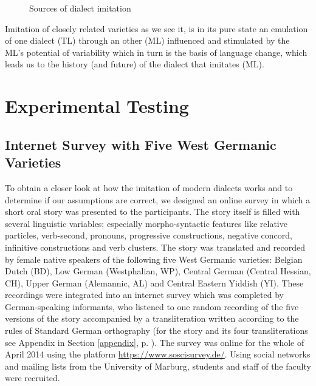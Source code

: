 \documentclass[output=paper]{LSP/langsci}
\begin{document}
\begin{figure}[htbp]
 \begin{center}
              \caption{Sources of dialect imitation}\label{imitationalssubtraktiveFarbmischung}	%
\end{center}
 \end{figure}
\FloatBarrier

 
Imitation of closely related varieties as we see it, is in its pure state an emulation of one dialect (TL) through an other (ML) influenced and stimulated by the ML's potential of variability which in turn is the basis of language change, which leads us to the history (and future) of the dialect that imitates (ML).

 \section{Experimental Testing}\label{experiment}
 
 
 \subsection{Internet Survey with Five West Germanic Varieties }\label{online}

To obtain a closer look at how the imitation of modern dialects works and to determine if our assumptions are correct, we designed an online survey in which a short oral story was presented to the participants. The story itself is filled with several linguistic variables; especially morpho-syntactic features like relative particles, verb-second, pronouns, progressive constructions, negative concord, infinitive constructions and verb clusters. The story was translated and recorded by female native speakers of the following five West Germanic varieties: Belgian Dutch (BD), Low German (Westphalian, WP), Central German (Central Hessian, CH), Upper German (Alemannic, AL) and Central Eastern Yiddish (YI). These recordings were integrated into an internet survey which was completed by German-speaking informants, who listened to one random recording of the five versions of the story accompanied by a transliteration written according to the rules of Standard German orthography (for the story and its four transliterations see Appendix in Section \ref{appendix}, p. \pageref{appendix}). The survey was online for the whole of April 2014 using the platform \url{https://www.soscisurvey.de/}. Using social networks and mailing lists from the University of Marburg, students and staff of the faculty were recruited.
\end{document}
